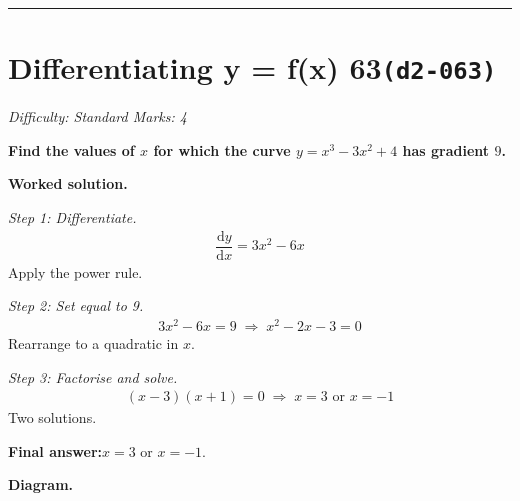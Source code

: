 \documentclass[11pt]{article}
\newcommand{\question}[1]{\par\medskip\noindent\textbf{#1}\par}
\begin{document}
\medskip\hrule

\section*{Differentiating y = f(x) 63\quad\small\texttt{(d2-063)}}
\textit{Difficulty: Standard \quad\textbar\quad Marks: 4}

\question{Find the values of \( x \) for which the curve \( y = x^3 - 3x^2 + 4 \) has gradient \( 9 \).}

\textbf{Worked solution.}

\textit{Step 1: Differentiate.}
\[\begin{gathered}
\dfrac{\mathrm{d}y}{\mathrm{d}x} = 3x^2 - 6x
\end{gathered}\]
Apply the power rule.

\textit{Step 2: Set equal to 9.}
\[\begin{gathered}
3x^2 - 6x = 9 \;\Rightarrow\; x^2 - 2x - 3 = 0
\end{gathered}\]
Rearrange to a quadratic in \( x \).

\textit{Step 3: Factorise and solve.}
\[\begin{gathered}
(x - 3)(x + 1) = 0 \;\Rightarrow\; x = 3 \text{ or } x = -1
\end{gathered}\]
Two solutions.

\begin{answerbox}
\textbf{Final answer:}\quad \(\displaystyle  x = 3 \) or \(\displaystyle  x = -1 \).
\end{answerbox}
\textbf{Diagram.}
\end{document}

